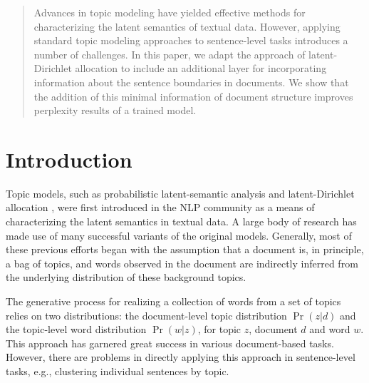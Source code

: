 \begin{abstract}

Advances in topic modeling have yielded effective methods for characterizing
the latent semantics of textual data.  However, applying standard topic
modeling approaches to sentence-level tasks introduces a number of challenges.
In this paper, we adapt the approach of latent-Dirichlet allocation to include
an additional layer for incorporating information about the sentence boundaries
in documents.  We show that the addition of this minimal information of
document structure improves perplexity results of a trained model.  

\end{abstract}

\section{Introduction} \label{s:introduction}

Topic models, such as probabilistic latent-semantic analysis
\cite{hofmann1999probabilistic} and latent-Dirichlet allocation
\cite{blei2003latent}, were first introduced in the NLP community as a means of
characterizing the latent semantics in textual data.  A large body of
research has made use of many successful variants of the
original models.  Generally, most of these previous efforts began with the
assumption that a document is, in principle, a bag of topics, and words 
observed in the document are indirectly inferred from the underlying
distribution of these background topics.  


The generative process for realizing a collection of words from a set of topics
relies on two distributions: the document-level topic distribution $\Pr(z|d)$
and the topic-level word distribution $\Pr(w|z)$, for topic $z$, document $d$
and word $w$.   This approach has garnered great success in various
document-based tasks.  However, there are problems in directly applying this
approach in sentence-level tasks, e.g., clustering individual sentences by
topic.

